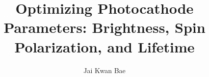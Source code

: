\title {Optimizing Photocathode Parameters: Brightness, Spin Polarization, and Lifetime}
\author {Jai Kwan Bae}
